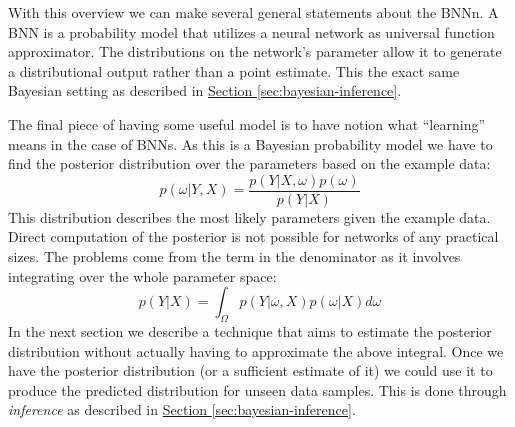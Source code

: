 \documentclass[12pt,a4paper,twoside]{scrartcl}
\numberwithin{equation}{section}
\newcommand{\refsec}[1]{\hyperref[#1]{Section \ref*{#1}}}
\begin{document}
With this overview we can make several general statements about the BNNn. A BNN is a probability model that utilizes a neural network as universal function approximator. The distributions on the network's parameter allow it to generate a distributional output rather than a point estimate. This the exact same Bayesian setting as described in \refsec{sec:bayesian-inference}. 

The final piece of having some useful model is to have notion what ``learning'' means in the case of BNNs. As this is a Bayesian probability model we have to find the posterior distribution over the parameters based on the example data:
\begin{equation}
  p(\omega|Y,X)=\frac{p(Y|X,\omega)p(\omega)}{p(Y|X)}
\end{equation}
This distribution describes the most likely parameters given the example data. Direct computation of the posterior is not possible for networks of any practical sizes. The problems come from the term in the denominator as it involves integrating over the whole parameter space:
\begin{equation}
  p(Y|X) = \int_{\Omega} p(Y|\omega , X)p(\omega|X)d \omega
\end{equation}
In the next section we describe a technique that aims to estimate the posterior distribution without actually having to approximate the above integral. Once we have the posterior distribution (or a sufficient estimate of it) we could use it to produce the predicted distribution for unseen data samples. This is done through \emph{inference} as described in \refsec{sec:bayesian-inference}.
\end{document}
